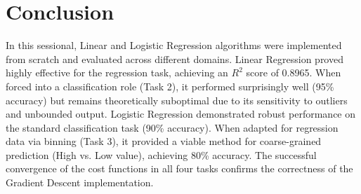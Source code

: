\documentclass[11pt]{article}
\begin{document}
\section{Conclusion}
In this sessional, Linear and Logistic Regression algorithms were implemented from scratch and evaluated across different domains. Linear Regression proved highly effective for the regression task, achieving an $R^2$ score of 0.8965. When forced into a classification role (Task 2), it performed surprisingly well (95\% accuracy) but remains theoretically suboptimal due to its sensitivity to outliers and unbounded output. Logistic Regression demonstrated robust performance on the standard classification task (90\% accuracy). When adapted for regression data via binning (Task 3), it provided a viable method for coarse-grained prediction (High vs. Low value), achieving 80\% accuracy. The successful convergence of the cost functions in all four tasks confirms the correctness of the Gradient Descent implementation.



\renewcommand{\bibname}{References}

\end{document}

